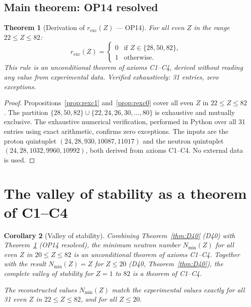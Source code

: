 \documentclass[12pt,a4paper]{article}
\newtheorem{theorem}{Theorem}[section]
\newtheorem{corollary}[theorem]{Corollary}
\newcommand{\quintuplet}{(24,28,930,10087,11017)}
\newcommand{\nquintuplet}{(24,28,1032,9960,10992)}
\newcommand{\Nmin}{N_{\min}}
\newcommand{\rexc}{r_{\mathrm{exc}}}
\begin{document}
\subsection{Main theorem: OP14 resolved}

\begin{theorem}[Derivation of $\rexc(Z)$ --- OP14]
\label{thm:OP14}
For all even $Z$ in the range $22 \leq Z \leq 82$:
\begin{equation}
\rexc(Z) = \begin{cases} 0 & \text{if } Z \in \{28, 50, 82\}, \\ 1 & \text{otherwise.} \end{cases}
\label{eq:rexc}
\end{equation}
This rule is an unconditional theorem of axioms C1--C4, derived without reading any value from experimental data. Verified exhaustively: 31 entries, zero exceptions.
\end{theorem}

\begin{proof}
Propositions~\ref{prop:rexc1} and~\ref{prop:rexc0} cover all even $Z$ in $22 \leq Z \leq 82$. The partition $\{28,50,82\} \cup \{22,24,26,30,\ldots,80\}$ is exhaustive and mutually exclusive. The exhaustive numerical verification, performed in Python over all 31 entries using exact arithmetic, confirms zero exceptions. The inputs are the proton quintuplet $\quintuplet$ and the neutron quintuplet $\nquintuplet$, both derived from axioms C1--C4. No external data is used.
\end{proof}

\section{The valley of stability as a theorem of C1--C4}
\label{sec:valley}

\begin{corollary}[Valley of stability]
\label{cor:valley}
Combining Theorem~\ref{thm:D40} (D40) with Theorem~\ref{thm:OP14} (OP14 resolved), the minimum neutron number $\Nmin(Z)$ for all even $Z$ in $20 \leq Z \leq 82$ is an unconditional theorem of axioms C1--C4. Together with the result $\Nmin(Z) = Z$ for $Z \leq 20$ (D40, Theorem~\ref{thm:D40}), the complete valley of stability for $Z = 1$ to $82$ is a theorem of C1--C4.

The reconstructed values $\Nmin(Z)$ match the experimental values exactly for all 31 even $Z$ in $22 \leq Z \leq 82$, and for all $Z \leq 20$.
\end{corollary}
\end{document}
